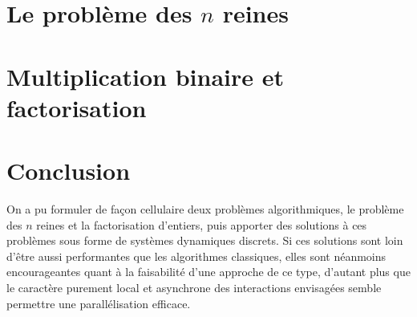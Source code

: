 \documentclass[11pt, openany, a4paper]{article}
\newcommand{\ANNOT}[1]{
  ~\linebreak
  \centerline{
    \large\fcolorbox{black}{bleuclair}{
      \begin{minipage}[h]{.8\linewidth}
      #1
      \end{minipage}
    }
  }
}
\begin{document}
\part*{Le problème des $n$ reines}
\label{part:nreines}




\setcounter{section}{0}
\part*{Multiplication binaire et factorisation}
\label{part:facto}





\part*{Conclusion}

On a pu formuler de façon cellulaire deux problèmes algorithmiques, le problème des $n$ reines et la factorisation d'entiers, puis apporter des solutions à ces problèmes sous forme de systèmes dynamiques discrets. Si ces solutions sont loin d'être aussi performantes que les algorithmes classiques, elles sont néanmoins encourageantes quant à la faisabilité d'une approche de ce type, d'autant plus que le caractère purement local et asynchrone des interactions envisagées semble permettre une parallélisation efficace. 







\end{document}
